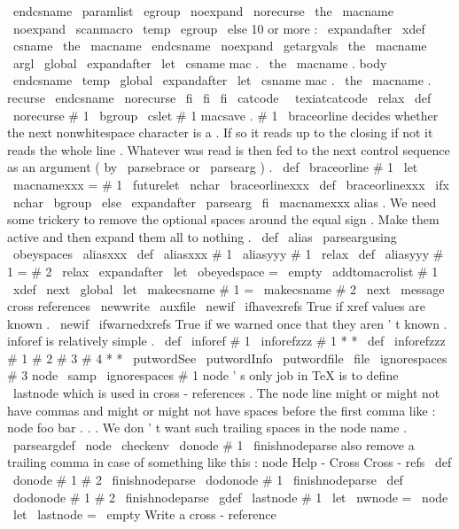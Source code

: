 {{{{{\
endcsname
\
paramlist
{
%
\
egroup
\
noexpand
\
norecurse
{
\
the
\
macname
}
%
\
noexpand
\
scanmacro
{
\
temp
}
\
egroup
}
%
\
else
%
10
or
more
:
\
expandafter
\
xdef
\
csname
\
the
\
macname
\
endcsname
{
%
\
noexpand
\
getargvals
{
\
the
\
macname
}
{
\
argl
}
%
}
%
\
global
\
expandafter
\
let
\
csname
mac
.
\
the
\
macname
.
body
\
endcsname
\
temp
\
global
\
expandafter
\
let
\
csname
mac
.
\
the
\
macname
.
recurse
\
endcsname
\
norecurse
\
fi
\
fi
\
fi
}
\
catcode
\
\
texiatcatcode
\
relax
\
def
\
norecurse
#
1
{
\
bgroup
\
cslet
{
#
1
}
{
macsave
.
#
1
}
}
%
\
braceorline
decides
whether
the
next
nonwhitespace
character
is
a
%
{
.
If
so
it
reads
up
to
the
closing
}
if
not
it
reads
the
whole
%
line
.
Whatever
was
read
is
then
fed
to
the
next
control
sequence
%
as
an
argument
(
by
\
parsebrace
or
\
parsearg
)
.
%
\
def
\
braceorline
#
1
{
\
let
\
macnamexxx
=
#
1
\
futurelet
\
nchar
\
braceorlinexxx
}
\
def
\
braceorlinexxx
{
%
\
ifx
\
nchar
\
bgroup
\
else
\
expandafter
\
parsearg
\
fi
\
macnamexxx
}
%
alias
.
%
We
need
some
trickery
to
remove
the
optional
spaces
around
the
equal
%
sign
.
Make
them
active
and
then
expand
them
all
to
nothing
.
%
\
def
\
alias
{
\
parseargusing
\
obeyspaces
\
aliasxxx
}
\
def
\
aliasxxx
#
1
{
\
aliasyyy
#
1
\
relax
}
\
def
\
aliasyyy
#
1
=
#
2
\
relax
{
%
{
%
\
expandafter
\
let
\
obeyedspace
=
\
empty
\
addtomacrolist
{
#
1
}
%
\
xdef
\
next
{
\
global
\
let
\
makecsname
{
#
1
}
=
\
makecsname
{
#
2
}
}
%
}
%
\
next
}
\
message
{
cross
references
}
\
newwrite
\
auxfile
\
newif
\
ifhavexrefs
%
True
if
xref
values
are
known
.
\
newif
\
ifwarnedxrefs
%
True
if
we
warned
once
that
they
aren
'
t
known
.
%
inforef
is
relatively
simple
.
\
def
\
inforef
#
1
{
\
inforefzzz
#
1
*
*
}
\
def
\
inforefzzz
#
1
#
2
#
3
#
4
*
*
{
%
\
putwordSee
{
}
\
putwordInfo
{
}
\
putwordfile
{
}
\
file
{
\
ignorespaces
#
3
{
}
}
node
\
samp
{
\
ignorespaces
#
1
{
}
}
}
%
node
'
s
only
job
in
TeX
is
to
define
\
lastnode
which
is
used
in
%
cross
-
references
.
The
node
line
might
or
might
not
have
commas
and
%
might
or
might
not
have
spaces
before
the
first
comma
like
:
%
node
foo
bar
.
.
.
%
We
don
'
t
want
such
trailing
spaces
in
the
node
name
.
%
\
parseargdef
\
node
{
\
checkenv
{
}
\
donode
#
1
\
finishnodeparse
}
%
%
also
remove
a
trailing
comma
in
case
of
something
like
this
:
%
node
Help
-
Cross
Cross
-
refs
\
def
\
donode
#
1
#
2
\
finishnodeparse
{
\
dodonode
#
1
\
finishnodeparse
}
\
def
\
dodonode
#
1
#
2
\
finishnodeparse
{
\
gdef
\
lastnode
{
#
1
}
}
\
let
\
nwnode
=
\
node
\
let
\
lastnode
=
\
empty
%
Write
a
cross
-
reference
}}}}
